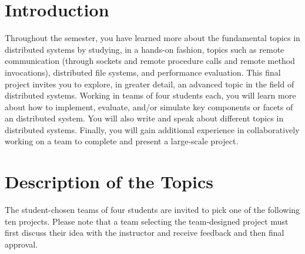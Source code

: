 

\usepackage[compact]{titlesec}


\section*{Introduction}

Throughout the semester, you have learned more about the fundamental topics in distributed systems by studying, in a
hands-on fashion, topics such as remote communication (through sockets and remote procedure calls and remote method
invocations), distributed file systems, and performance evaluation. This final project invites you to explore, in
greater detail, an advanced topic in the field of distributed systems. Working in teams of four students each, you will
learn more about how to implement, evaluate, and/or simulate key components or facets of an distributed system. You will
also write and speak about different topics in distributed systems.  Finally, you will gain additional experience in
collaboratively working on a team to complete and present a large-scale project.

\section*{Description of the Topics}

The student-chosen teams of four students are invited to pick one of the following ten projects.  Please note that a
team selecting the team-designed project must first discuss their idea with the instructor and receive feedback and
then final approval.

